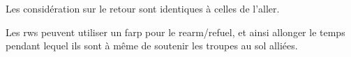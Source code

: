 \begin{e1}
{		Les considération sur le retour sont identiques à celles de l'aller.
		
		Les \gls{rw}s peuvent utiliser un \gls{farp} pour le rearm/refuel, et ainsi allonger le temps pendant lequel ils sont à même de soutenir les troupes au sol alliées.
		
	}
	
	
\end{e1}

